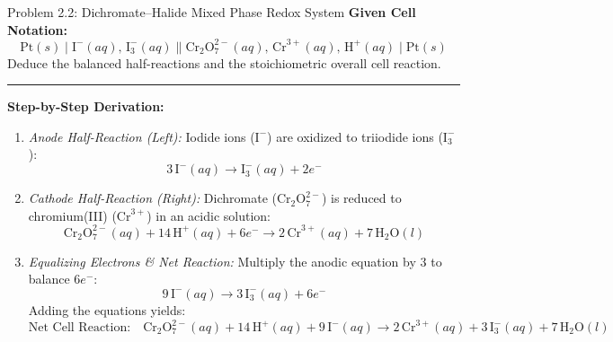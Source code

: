 \documentclass[10pt,a4paper]{article}
\begin{document}
\begin{examplebox}{Problem 2.2: Dichromate--Halide Mixed Phase Redox System}
\textbf{Given Cell Notation:}
\begin{equation*}
    \text{Pt}(s) \mid \text{I}^-(aq),\, \text{I}_3^-(aq) \parallel \text{Cr}_2\text{O}_7^{2-}(aq),\, \text{Cr}^{3+}(aq),\, \text{H}^+(aq) \mid \text{Pt}(s)
\end{equation*}
Deduce the balanced half-reactions and the stoichiometric overall cell reaction.

\vspace{0.3cm}\hrule\vspace{0.3cm}
\textbf{Step-by-Step Derivation:}
\begin{enumerate}
    \item \textit{Anode Half-Reaction (Left):}
    Iodide ions ($\text{I}^-$) are oxidized to triiodide ions ($\text{I}_3^-$):
    $$3\,\text{I}^-(aq) \longrightarrow \text{I}_3^-(aq) + 2e^-$$
    \item \textit{Cathode Half-Reaction (Right):}
    Dichromate ($\text{Cr}_2\text{O}_7^{2-}$) is reduced to chromium(III) ($\text{Cr}^{3+}$) in an acidic solution:
    $$\text{Cr}_2\text{O}_7^{2-}(aq) + 14\,\text{H}^+(aq) + 6e^- \longrightarrow 2\,\text{Cr}^{3+}(aq) + 7\,\text{H}_2\text{O}(l)$$
    \item \textit{Equalizing Electrons \& Net Reaction:}
    Multiply the anodic equation by $3$ to balance $6e^-$:
    $$9\,\text{I}^-(aq) \longrightarrow 3\,\text{I}_3^-(aq) + 6e^-$$
    Adding the equations yields:
    $$\text{Net Cell Reaction:} \quad \text{Cr}_2\text{O}_7^{2-}(aq) + 14\,\text{H}^+(aq) + 9\,\text{I}^-(aq) \longrightarrow 2\,\text{Cr}^{3+}(aq) + 3\,\text{I}_3^-(aq) + 7\,\text{H}_2\text{O}(l)$$
\end{enumerate}
\end{examplebox}
\end{document}
